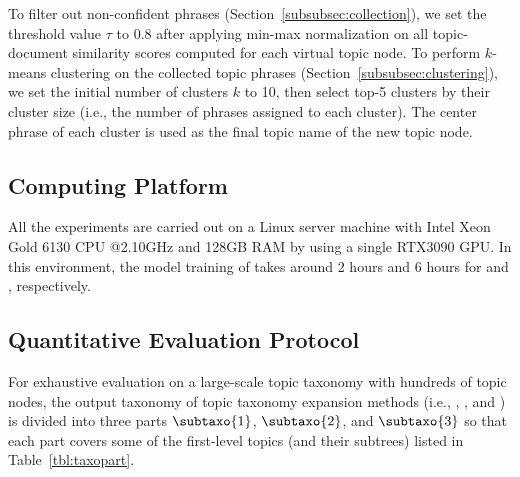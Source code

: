 To filter out non-confident phrases (Section~\ref{subsubsec:collection}), we set the threshold value $\tau$ to 0.8 after applying min-max normalization on all topic-document similarity scores computed for each virtual topic node.
To perform $k$-means clustering on the collected topic phrases (Section~\ref{subsubsec:clustering}), we set the initial number of clusters $k$ to 10, then select top-5 clusters by their cluster size (i.e., the number of phrases assigned to each cluster).
The center phrase of each cluster is used as the final topic name of the new topic node.

\subsection{Computing Platform}
All the experiments are carried out on a Linux server machine with Intel Xeon Gold 6130 CPU @2.10GHz and 128GB RAM by using a single RTX3090 GPU.
In this environment, the model training of \proposed takes around 2 hours and 6 hours for \amazon and \dbpedia, respectively.

\begin{table}[b]
\small
\caption{Three disjoint parts of the topic taxonomy.}
\label{tbl:taxopart}
\centering
{}
\end{table}

\subsection{Quantitative Evaluation Protocol}
\label{subsec:evalprotocol}
For exhaustive evaluation on a large-scale topic taxonomy with hundreds of topic nodes, the output taxonomy of topic taxonomy expansion methods (i.e., \corel, \taxocom, and \proposed) is divided into three parts $\subtaxo{1}$, $\subtaxo{2}$, and $\subtaxo{3}$ so that each part covers some of the first-level topics (and their subtrees) listed in Table~\ref{tbl:taxopart}.

